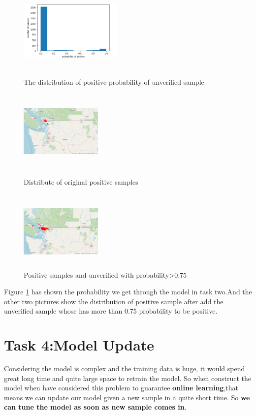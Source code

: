 \documentclass[12pt]{article}
\begin{document}
\begin{figure}[H]
	\small
	\centering
	\begin{minipage}{5cm}
		\label{prob}
		\includegraphics[width=5cm,height=4cm]{./pictures/prob.png}
		\caption{The distribution of positive probability of unverified sample} 
	\end{minipage}
	\begin{minipage}{4cm}
		\includegraphics[width=4cm,height=4cm]{./pictures/pos.png}
		\caption{Distribute of original positive samples}
	\end{minipage}
	\begin{minipage}{4cm}
		\includegraphics[width=4cm,height=4cm]{./pictures/addun.png}
		\caption{Positive samples and unverified with probability>0.75}
	\end{minipage}
\end{figure}
Figure \ref{prob} has shown the probability we get through the model in task two.And the other two pictures show the distribution of positive sample after add the unverified sample whose has more than 0.75 probability to be positive.


\section{Task 4:Model Update}
Considering the model is complex and the training data is huge, it would spend great long time and quite large space to retrain the model. So when construct the model when have considered this problem to guarantee \textbf{online learning},that means we can update our model given a new sample in a quite short time. So \textbf{we can tune the model as soon as new sample comes in}.
\end{document}
